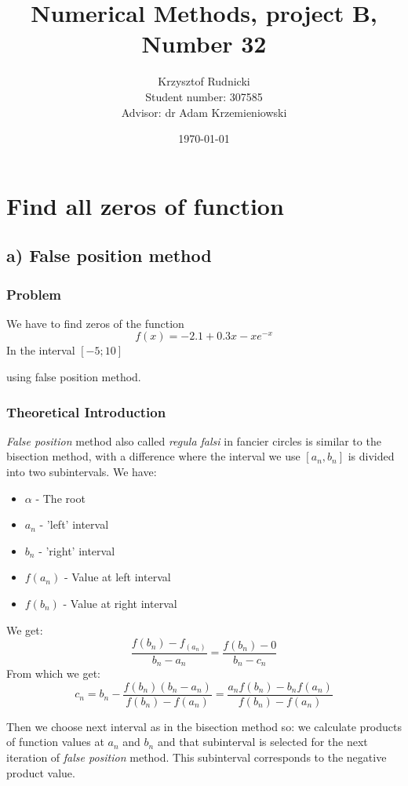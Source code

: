\documentclass[12pt]{report}
\title{Numerical Methods, project B, Number 32}
\author{Krzysztof Rudnicki\\ Student number: 307585 \\ Advisor: dr Adam Krzemieniowski}
\date{\today}
\begin{document}
\maketitle
\tableofcontents

\chapter{Find all zeros of function}

\section{a) False position method}

\subsection{Problem}

We have to find zeros of the function
\[ f(x) = -2.1 + 0.3x - xe^{-x} \]
In the interval $[-5; 10]$

using false position method.

\subsection{Theoretical Introduction}
\emph{False position} method also called \emph{regula falsi} in fancier circles is similar to the bisection method, with a difference where the interval we use $[a_n, b_n]$ is divided into two subintervals. We have:
\begin{itemize}
\item $\alpha$ - The root
\item $a_n$ - 'left' interval
\item $b_n$ - 'right' interval
\item $f(a_n)$ - Value at left interval
\item $f(b_n)$ - Value at right interval
\end{itemize}

We get:
\[ \frac{f(b_n) - f_(a_n)}{b_n - a_n} = \frac{f(b_n) - 0}{b_n - c_n} \]
From which we get:
\[ c_n = b_n - \frac{f(b_n)(b_n - a_n)}{f(b_n) - f(a_n)} = \frac{a_nf(b_n) - b_n f(a_n)}{f(b_n)-f(a_n)} \]

Then we choose next interval as in the bisection method so: we calculate products of function values at $a_n$ and $b_n$ and that subinterval is selected for the next iteration of \emph{false position} method. This subinterval corresponds to the negative product value.
\end{document}
